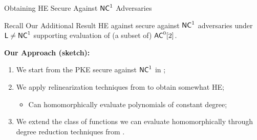 \begin{frame}[t]{Obtaining HE Secure Against ${\mathsf{NC}}^1$ Adversaries}
\begin{block}{Recall Our Additional Result}
	HE against secure against ${\mathsf{NC}}^1$ adversaries under ${\mathsf{L}} \not = {\mathsf{NC}}^1$ supporting evaluation of (a subset of) ${\mathsf{AC}}^0[2]$.
\end{block}
\pause
\bigskip
	\textbf{Our Approach (sketch):}
	\begin{enumerate}[<+- | alert@+>]
		\item We start from the PKE secure against ${\mathsf{NC}}^1$ in \cite{fgcrypto};
		\item We apply relinearization techniques from \cite{fhe-lwe} to obtain somewhat HE;
		\begin{itemize}
			\item Can homomorphically evaluate polynomials of constant degree; 
		\end{itemize}
		\item We extend the class of functions we can evaluate homomorphically through degree reduction techniques from \cite{razborov1987lower}.
	\end{enumerate}%
\end{frame}
